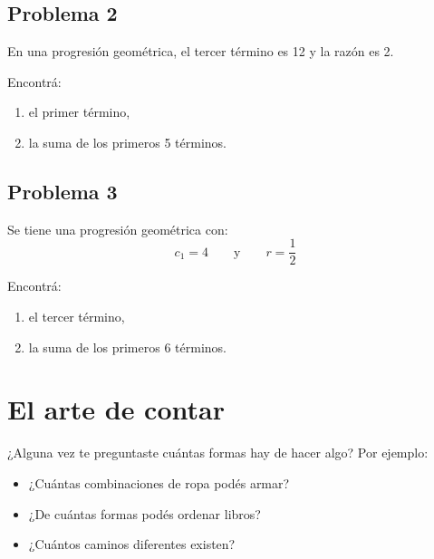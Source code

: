 \documentclass[12pt]{article}
\begin{document}
            \subsection{Problema 2}
                En una progresión geométrica, el tercer término es 12 y la razón es 2.

                \begin{desafio}
                    Encontrá:

                    \begin{enumerate}
                        \item el primer término,
                        \item la suma de los primeros 5 términos.
                    \end{enumerate}
                \end{desafio}

            \subsection{Problema 3}
                Se tiene una progresión geométrica con:
                \[
                c_1=4 \qquad \text{y} \qquad r=\frac{1}{2}
                \]

                \begin{desafio}
                    Encontrá:

                    \begin{enumerate}
                        \item el tercer término,
                        \item la suma de los primeros 6 términos.
                    \end{enumerate}
                \end{desafio}

    \newpage
    \section{El arte de contar}
    ¿Alguna vez te preguntaste cuántas formas hay de hacer algo?
    Por ejemplo:
    \begin{itemize}
        \item ¿Cuántas combinaciones de ropa podés armar?
        \item ¿De cuántas formas podés ordenar libros?
        \item ¿Cuántos caminos diferentes existen?
    \end{itemize}
\end{document}
